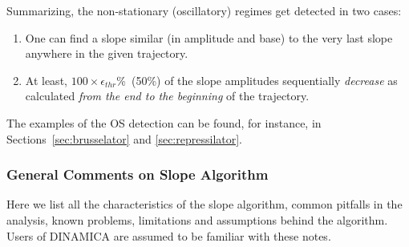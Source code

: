 \documentclass[11pt,a4paper]{article}
\begin{document}
Summarizing, the non-stationary (oscillatory) regimes get detected in two cases:
\begin{enumerate}
\item One can find a slope similar (in amplitude and base) to the very last slope
  anywhere in the given trajectory.
\item At least, $100\times\epsilon_{thr}$\%~(50\%) of the slope amplitudes
  sequentially \textit{decrease} as calculated \textit{from the end to the beginning}
  of the trajectory.
\end{enumerate}

The examples of the OS detection can be found, for instance, in
Sections~\ref{sec:brusselator} and \ref{sec:repressilator}.


\subsubsection{General Comments on Slope Algorithm}
\label{sec:gener-comm-slope}

Here we list all the characteristics of the slope algorithm, common
pitfalls in the analysis, known problems, limitations and assumptions behind the
algorithm. Users of DINAMICA are assumed to be familiar with these notes.
\end{document}
